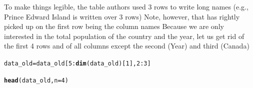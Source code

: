 \documentclass[aspectratio=169]{beamer}\usepackage[]{graphicx}\usepackage[]{xcolor}
\makeatletter
\newcommand{\hlnum}[1]{\textcolor[rgb]{0.686,0.059,0.569}{#1}}%
\newcommand{\hlopt}[1]{\textcolor[rgb]{0,0,0}{#1}}%
\newcommand{\hldef}[1]{\textcolor[rgb]{0.345,0.345,0.345}{#1}}%
\newcommand{\hlkwb}[1]{\textcolor[rgb]{0.69,0.353,0.396}{#1}}%
\newcommand{\hlkwc}[1]{\textcolor[rgb]{0.333,0.667,0.333}{#1}}%
\newcommand{\hlkwd}[1]{\textcolor[rgb]{0.737,0.353,0.396}{\textbf{#1}}}%
\newenvironment{kframe}{%
 \def\at@end@of@kframe{}%
 \ifinner\ifhmode%
  \def\at@end@of@kframe{\end{minipage}}%
  \begin{minipage}{\columnwidth}%
 \fi\fi%
 \def\FrameCommand##1{\hskip\@totalleftmargin \hskip-\fboxsep
 \colorbox{shadecolor}{##1}\hskip-\fboxsep
     \hskip-\linewidth \hskip-\@totalleftmargin \hskip\columnwidth}%
 \MakeFramed {\advance\hsize-\width
   \@totalleftmargin\z@ \linewidth\hsize
   \@setminipage}}%
 {\par\unskip\endMakeFramed%
 \at@end@of@kframe}
\newenvironment{knitrout}{}{} %
\makeatother
\begin{document}
\begin{frame}[fragile]
To make things legible, the table authors used 3 rows to write long names (e.g., Prince Edward Island is written over 3 rows)
\vfill
Note, however, that  has rightly picked up on the first row being the column names
\vfill
Because we are only interested in the total population of the country and the year, let us get rid of the first 4 rows and of all columns except the second (Year) and third (Canada)

\begin{knitrout}
\color{fgcolor}\begin{kframe}
\begin{alltt}
\hldef{data_old} \hlkwb{=} \hldef{data_old[}\hlnum{5}\hlopt{:}\hlkwd{dim}\hldef{(data_old)[}\hlnum{1}\hldef{],} \hlnum{2}\hlopt{:}\hlnum{3}\hldef{]}
\end{alltt}


{\ttfamily\noindent\bfseries\color{errorcolor}{\#\# Error:\\\#\# ! object 'data\_old' not found}}\begin{alltt}
\hlkwd{head}\hldef{(data_old,} \hlkwc{n}\hldef{=}\hlnum{4}\hldef{)}
\end{alltt}


{\ttfamily\noindent\bfseries\color{errorcolor}{\#\# Error in `h()`:\\\#\# ! error in evaluating the argument 'x' in selecting a method for function 'head': object 'data\_old' not found}}\end{kframe}
\end{knitrout}
\end{frame}
\end{document}
